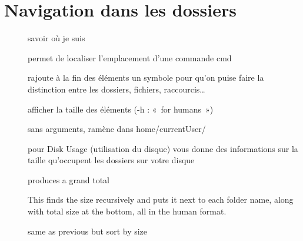 \documentclass[letterpaper,10pt,french]{sphinxmanual}
\begin{document}
\chapter{Navigation dans les dossiers}
\label{\detokenize{02-navigation:navigation-dans-les-dossiers}}\label{\detokenize{02-navigation::doc}}\begin{description}
\item[{}] \leavevmode
savoir où je suis

\item[{}] \leavevmode
permet de localiser l’emplacement d’une commande cmd

\item[{}] \leavevmode
rajoute à la fin des éléments un symbole pour qu’on puise faire la distinction entre les dossiers, fichiers, raccourcis…

\item[{}] \leavevmode
afficher la taille des éléments (-h : « for humans »)

\item[{}] \leavevmode
sans arguments, ramène dans home/currentUser/

\item[{}] \leavevmode
pour Disk Usage (utilisation du disque) vous donne des informations sur la taille qu’occupent les dossiers sur votre disque

\item[{}] \leavevmode
produces a grand total

\item[{}] \leavevmode
This finds the size recursively and puts it next to each folder name, along with total size at the bottom, all in the human format.

\item[{}] \leavevmode
same as previous but sort by size

\end{description}
\end{document}

